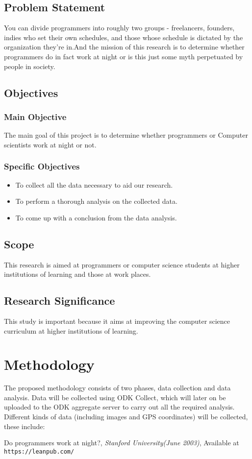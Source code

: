 \documentclass[options]{article}
\begin{document}
\subsection{\textbf{Problem Statement}}
You can divide programmers into roughly two groups - freelancers, founders, indies who set their own schedules, and those whose schedule is dictated by the organization they’re in.And the mission of this research is to determine whether programmers do in fact work at night or is this just some myth perpetuated by people in society.
\subsection{\textbf{Objectives}}


\subsubsection{\textbf{Main Objective}} 
The main goal of this project is to determine whether programmers or Computer scientists work at night or not.


\subsubsection{\textbf{Specific Objectives}}

\begin{itemize}
  \item To collect all the data necessary to aid our research.
  \item To perform a thorough analysis on the collected data.
  \item To come up with a conclusion from the data analysis.
\end{itemize}


\subsection{\textbf{Scope}}
This research is aimed at programmers or computer science students at higher institutions of learning and those at work places.

\subsection{\textbf{Research Significance}}
This study is important because it aims at improving the computer science curriculum at higher institutions of learning.




\section{\textbf{Methodology}}
The proposed methodology consists of two phases, data collection and data analysis.\bigbreak
Data will be collected using ODK Collect, which will later on be uploaded to the ODK aggregate server to carry out all the required analysis. Different kinds of data (including images and GPS coordinates) will be collected, these include: 





\begin{thebibliography}{10}  Do programmers work at night?, \emph{Stanford University(June 2003)}, Available at \texttt{https://leanpub.com/} \end{thebibliography}
\end{document}
